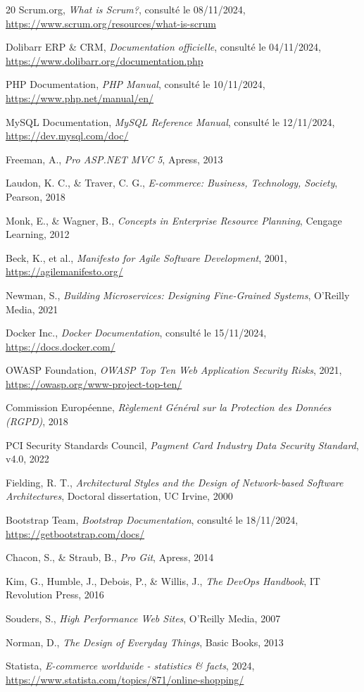 \documentclass[12pt,a4paper]{report}
\begin{document}

\begin{thebibliography}{20}
Scrum.org, \textit{What is Scrum?}, consulté le 08/11/2024, \url{https://www.scrum.org/resources/what-is-scrum}

Dolibarr ERP \& CRM, \textit{Documentation officielle}, consulté le 04/11/2024, \url{https://www.dolibarr.org/documentation.php}

PHP Documentation, \textit{PHP Manual}, consulté le 10/11/2024, \url{https://www.php.net/manual/en/}

MySQL Documentation, \textit{MySQL Reference Manual}, consulté le 12/11/2024, \url{https://dev.mysql.com/doc/}

Freeman, A., \textit{Pro ASP.NET MVC 5}, Apress, 2013

Laudon, K. C., \& Traver, C. G., \textit{E-commerce: Business, Technology, Society}, Pearson, 2018

Monk, E., \& Wagner, B., \textit{Concepts in Enterprise Resource Planning}, Cengage Learning, 2012

Beck, K., et al., \textit{Manifesto for Agile Software Development}, 2001, \url{https://agilemanifesto.org/}

Newman, S., \textit{Building Microservices: Designing Fine-Grained Systems}, O'Reilly Media, 2021

Docker Inc., \textit{Docker Documentation}, consulté le 15/11/2024, \url{https://docs.docker.com/}

OWASP Foundation, \textit{OWASP Top Ten Web Application Security Risks}, 2021, \url{https://owasp.org/www-project-top-ten/}

Commission Européenne, \textit{Règlement Général sur la Protection des Données (RGPD)}, 2018

PCI Security Standards Council, \textit{Payment Card Industry Data Security Standard}, v4.0, 2022

Fielding, R. T., \textit{Architectural Styles and the Design of Network-based Software Architectures}, Doctoral dissertation, UC Irvine, 2000

Bootstrap Team, \textit{Bootstrap Documentation}, consulté le 18/11/2024, \url{https://getbootstrap.com/docs/}

Chacon, S., \& Straub, B., \textit{Pro Git}, Apress, 2014

Kim, G., Humble, J., Debois, P., \& Willis, J., \textit{The DevOps Handbook}, IT Revolution Press, 2016

Souders, S., \textit{High Performance Web Sites}, O'Reilly Media, 2007

Norman, D., \textit{The Design of Everyday Things}, Basic Books, 2013

Statista, \textit{E-commerce worldwide - statistics \& facts}, 2024, \url{https://www.statista.com/topics/871/online-shopping/}
\end{thebibliography}
\end{document}
